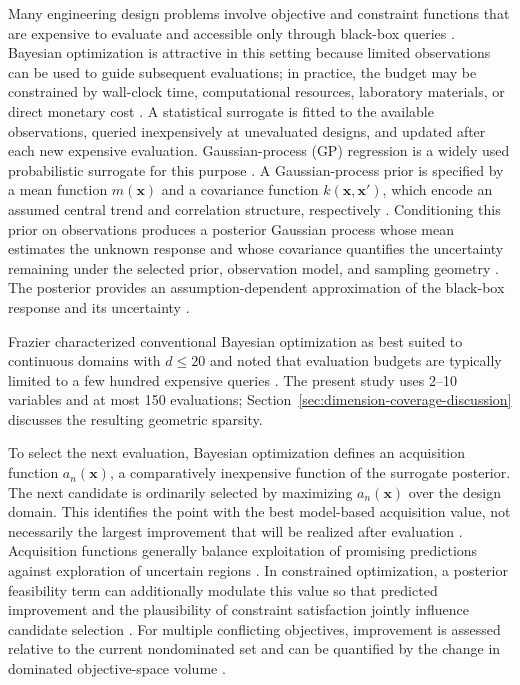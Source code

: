 \documentclass[twoside]{article}
\begin{document}
Many engineering design problems involve objective and constraint functions
that are expensive to evaluate and accessible only through black-box queries
\cite{jones1998ego,forrester2008engineering}. Bayesian optimization is
attractive in this setting because limited observations can be used to guide
subsequent evaluations; in practice, the budget may be constrained by
wall-clock time, computational resources, laboratory materials, or direct
monetary cost
\cite{frazier2018tutorial,shahriari2016review}. A statistical surrogate is
fitted to the available observations, queried inexpensively at unevaluated
designs, and updated after each new expensive evaluation. Gaussian-process
(GP) regression is a widely used probabilistic surrogate for this purpose
\cite{jones1998ego,forrester2008engineering,snoek2012practical}. A
Gaussian-process prior is specified by a mean function \(m(\mathbf{x})\) and a
covariance function \(k(\mathbf{x},\mathbf{x}')\), which encode an assumed
central trend and correlation structure, respectively
\cite{rasmussen2006gpml}.  Conditioning this prior on observations produces a
posterior Gaussian process whose mean estimates the unknown response and whose
covariance quantifies the uncertainty remaining under the selected prior,
observation model, and sampling geometry
\cite{rasmussen2006gpml,snoek2012practical}. The posterior provides an
assumption-dependent approximation of the black-box response and its
uncertainty \cite{rasmussen2006gpml}.

Frazier characterized conventional Bayesian optimization as best suited to
continuous domains with \(d\leq20\) and noted that evaluation budgets are
typically limited to a few hundred expensive queries
\cite{frazier2018tutorial}. The present study uses 2--10 variables and at most
150 evaluations; Section~\ref{sec:dimension-coverage-discussion} discusses the
resulting geometric sparsity.

To select the next evaluation, Bayesian optimization defines an acquisition
function \(a_n(\mathbf{x})\), a comparatively inexpensive function of the
surrogate posterior.  The next candidate is ordinarily selected by maximizing
\(a_n(\mathbf{x})\) over the design domain.  This identifies the point with the
best model-based acquisition value, not necessarily the largest improvement
that will be realized after evaluation
\cite{jones1998ego,frazier2018tutorial}.  Acquisition functions generally
balance exploitation of promising predictions against exploration of
uncertain regions
\cite{shahriari2016review,snoek2012practical}.  In
constrained optimization, a posterior feasibility term can additionally
modulate this value so that predicted improvement and the plausibility of
constraint satisfaction jointly influence candidate selection
\cite{gardner2014constraints,gelbart2014unknown}.  For multiple conflicting
objectives, improvement is assessed relative to the current nondominated set
and can be quantified by the change in dominated objective-space volume
\cite{emmerich2011ehvi,daulton2020qehvi}.
\end{document}

